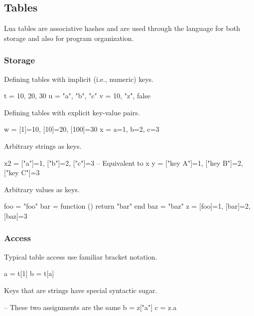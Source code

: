 \subsection{Tables}

Lua tables are associative hashes and are used through the language for both
storage and also for program organization.

\subsubsection{Storage}

Defining tables with implicit (i.e., numeric) keys.

\begin{LuaCode}
t = { 10, 20, 30 }
u = { "a", "b", "c" }
v = { 10, "z", false }
\end{LuaCode}

Defining tables with explicit key-value pairs.

\begin{LuaCode}
w = { [1]=10, [10]=20, [100]=30 }
x = { a=1, b=2, c=3 }
\end{LuaCode}

Arbitrary strings as keys.

\begin{LuaCode}
x2 = { ["a"]=1, ["b"]=2, ["c"]=3 } -- Equivalent to x
y = { ["key A"]=1, ["key B"]=2, ["key C"]=3 }
\end{LuaCode}

Arbitrary values as keys.

\begin{LuaCode}
foo = "foo"
bar = function () return "bar" end
baz = { "baz" }
z = { [foo]=1, [bar]=2, [baz]=3 }
\end{LuaCode}

\subsubsection{Access}

Typical table access use familiar bracket notation.

\begin{LuaCode}
a = t[1]
b = t[a]
\end{LuaCode}

Keys that are strings have special syntactic sugar.

\begin{LuaCode}
-- These two assignments are the same
b = z["a"]
c = z.a
\end{LuaCode}

